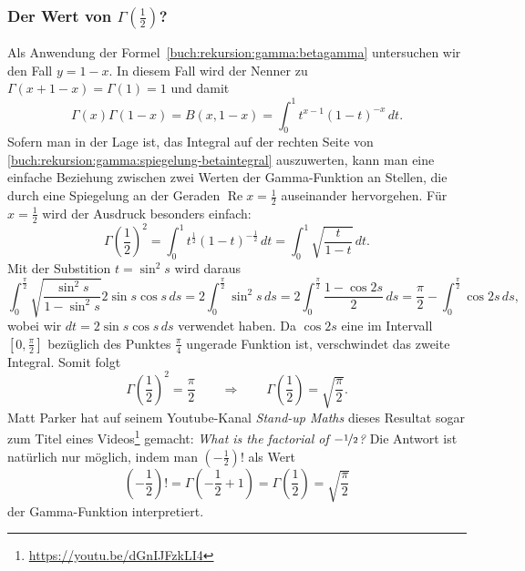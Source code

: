 \subsubsection{Der Wert von $\Gamma(\frac12)$?}
Als Anwendung der Formel~\eqref{buch:rekursion:gamma:betagamma}
untersuchen wir den Fall $y=1-x$.
In diesem Fall wird der Nenner zu $\Gamma(x+1-x)=\Gamma(1)=1$ und damit
\begin{equation}
\Gamma(x)\Gamma(1-x)
=
B(x,1-x) 
=
\int_0^1 t^{x-1}(1-t)^{-x}\,dt.
\label{buch:rekursion:gamma:spiegelung-betaintegral}
\end{equation}
Sofern man in der Lage ist, das Integral auf der rechten Seite von
\eqref{buch:rekursion:gamma:spiegelung-betaintegral} auszuwerten,
kann man eine einfache Beziehung zwischen zwei Werten der Gamma-Funktion
an Stellen, die durch eine Spiegelung an der Geraden
$\operatorname{Re}x=\frac12$ auseinander hervorgehen.
Für $x=\frac12$ wird der Ausdruck besonders einfach:
\[
\Gamma({\textstyle\frac12})^2
=
\int_0^1 t^{\frac12}(1-t)^{-\frac12}\,dt
=
\int_0^1 \sqrt{\frac{t}{1-t}}\,dt.
\]
Mit der Substition $t=\sin^2 s$ wird daraus
\[
\int_0^{\frac{\pi}2}
\sqrt{\frac{\sin^2s}{1-\sin^2s}}
2\sin s\cos s
\,ds
=
2
\int_0^{\frac{\pi}2}
\sin^2 s\,ds
=
2
\int_0^{\frac{\pi}2}
\frac{1-\cos 2s}{2}\,ds
=
\frac{\pi}2-\int_0^{\frac{\pi}2}\cos 2s\,ds,
\]
wobei wir $dt = 2\sin s\cos s\,ds$ verwendet haben.
Da $\cos 2s$ eine im Intervall $[0,\frac{\pi}2]$ bezüglich
des Punktes $\frac{\pi}4$ ungerade Funktion ist, verschwindet
das zweite Integral.
Somit folgt
\begin{equation}
\Gamma({\textstyle\frac12})^2 = \frac{\pi}{2}
\qquad\Rightarrow\qquad
\Gamma({\textstyle\frac12}) = \sqrt{\frac{\pi}{2}}.
\label{buch:rekursion:gamma:gamma12}
\end{equation}
Matt Parker hat auf seinem Youtube-Kanal {\em Stand-up Maths} dieses Resultat
sogar zum Titel eines Videos\footnote{\url{https://youtu.be/dGnIJFzkLI4}}
gemacht:
{\em What is the factorial of $-\nicefrac{1}{2}$?}
Die Antwort ist natürlich nur möglich, indem man
$(-\frac12)!$ als Wert
\[
(-{\textstyle\frac12})!
=
\Gamma(-{\textstyle\frac12}+1)
=
\Gamma({\textstyle\frac12})
=
\sqrt{\frac{\pi}2}
\]
der Gamma-Funktion interpretiert.

